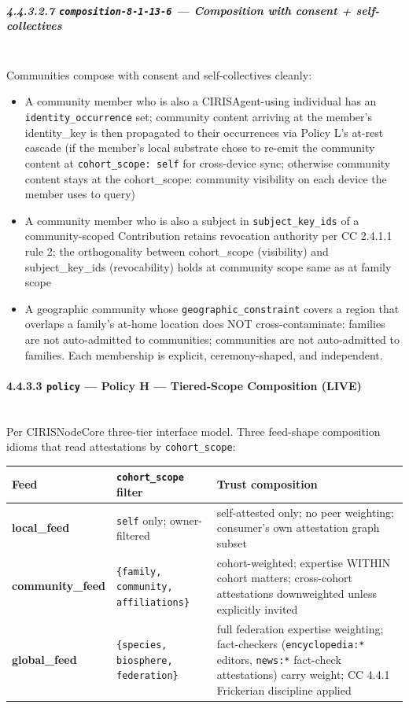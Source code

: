 \documentclass[11pt]{article}
\begin{document}
\subparagraph{4.4.3.2.7 \texttt{composition-8-1-13-6} — Composition with consent + self-collectives}\mbox{}\\


Communities compose with consent and self-collectives cleanly:


\begin{itemize}\setlength\itemsep{0pt}
\item A community member who is also a CIRISAgent-using individual has an \texttt{identity\_occurrence} set; community content arriving at the member's identity\_key is then propagated to their occurrences via Policy L's at-rest cascade (if the member's local substrate chose to re-emit the community content at \texttt{cohort\_scope: self} for cross-device sync; otherwise community content stays at the cohort\_scope: community visibility on each device the member uses to query)
\item A community member who is also a subject in \texttt{subject\_key\_ids} of a community-scoped Contribution retains revocation authority per CC 2.4.1.1 rule 2; the orthogonality between cohort\_scope (visibility) and subject\_key\_ids (revocability) holds at community scope same as at family scope
\item A geographic community whose \texttt{geographic\_constraint} covers a region that overlaps a family's at-home location does NOT cross-contaminate: families are not auto-admitted to communities; communities are not auto-admitted to families. Each membership is explicit, ceremony-shaped, and independent.
\end{itemize}


\paragraph{4.4.3.3 \texttt{policy} — Policy H — Tiered-Scope Composition (LIVE)}\mbox{}\\


Per CIRISNodeCore three-tier interface model. Three feed-shape composition idioms that read attestations by \texttt{cohort\_scope}:


{\footnotesize
\begin{longtable}{|p{5.33cm}|p{5.33cm}|p{5.33cm}|}\hline
\textbf{Feed} & \textbf{\texttt{cohort\_scope} filter} & \textbf{Trust composition} \\ \hline\endhead
\textbf{local\_feed} & \texttt{self} only; owner-filtered & self-attested only; no peer weighting; consumer's own attestation graph subset \\ \hline
\textbf{community\_feed} & \texttt{\{family, community, affiliations\}} & cohort-weighted; expertise WITHIN cohort matters; cross-cohort attestations downweighted unless explicitly invited \\ \hline
\textbf{global\_feed} & \texttt{\{species, biosphere, federation\}} & full federation expertise weighting; fact-checkers (\texttt{encyclopedia:*} editors, \texttt{news:*} fact-check attestations) carry weight; CC 4.4.1 Frickerian discipline applied \\ \hline
\end{longtable}}
\end{document}
